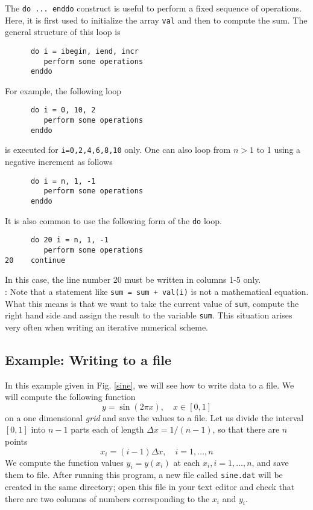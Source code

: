 \documentclass[11pt,oneside]{amsart}
\begin{document}
The {\tt do ... enddo} construct is useful to perform a fixed sequence of operations. Here, it is first used to initialize the array {\tt val} and then to compute the sum. The general structure of this loop is
\begin{verbatim}
      do i = ibegin, iend, incr
         perform some operations
      enddo
\end{verbatim}
For example, the following loop
\begin{verbatim}
      do i = 0, 10, 2
         perform some operations
      enddo
\end{verbatim}
is executed for {\tt i=0,2,4,6,8,10} only. One can also loop from $n>1$ to 1 using a negative increment as follows
\begin{verbatim}
      do i = n, 1, -1
         perform some operations
      enddo
\end{verbatim}
It is also common to use the following form of the {\tt do} loop.
\begin{verbatim}
      do 20 i = n, 1, -1
         perform some operations
20    continue
\end{verbatim}
In this case, the line number 20 must be written in columns 1-5 only.\\

: Note that a statement like {\tt sum = sum + val(i)} is not a mathematical equation. What this means is that we want to take the current value of {\tt sum}, compute the right hand side and assign the result to the variable {\tt sum}. This situation arises very often when writing an iterative numerical scheme.
\subsection{Example: Writing to a file}

In this example given in Fig. \ref{sine}, we will see how to write data to a file. We will compute the following function
\begin{equation*}
y = \sin(2 \pi x), \quad x \in [0,1]
\end{equation*}
on a one dimensional {\em grid} and save the values to a file. Let us divide the interval $[0,1]$ into $n-1$ parts each of length $\Delta x = 1/(n-1)$, so that there are $n$ points
\begin{equation}
x_i = (i-1) \Delta x, \quad i=1,\ldots,n
\end{equation}
We compute the function values $y_i = y(x_i)$ at each $x_i, i=1,\ldots,n$, and save them to file. After running this program, a new file called {\tt sine.dat} will be created in the same directory; open this file in your text editor and check that there are two columns of numbers corresponding to the $x_i$ and $y_i$.
\end{document}
